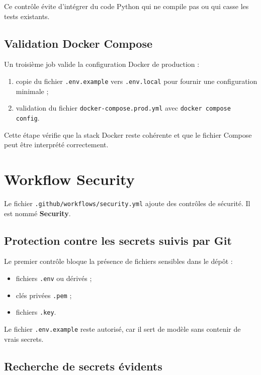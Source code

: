 \documentclass[11pt,a4paper]{article}
\begin{document}
Ce contrôle évite d'intégrer du code Python qui ne compile pas ou qui casse les
tests existants.

\subsection{Validation Docker Compose}

Un troisième job valide la configuration Docker de production :

\begin{enumerate}
  \item copie du fichier \texttt{.env.example} vers \texttt{.env.local} pour
        fournir une configuration minimale ;
  \item validation du fichier \texttt{docker-compose.prod.yml} avec
        \texttt{docker compose config}.
\end{enumerate}

Cette étape vérifie que la stack Docker reste cohérente et que le fichier Compose
peut être interprété correctement.

\section{Workflow Security}

Le fichier \texttt{.github/workflows/security.yml} ajoute des contrôles de
sécurité. Il est nommé \textbf{Security}.

\subsection{Protection contre les secrets suivis par Git}

Le premier contrôle bloque la présence de fichiers sensibles dans le dépôt :

\begin{itemize}
  \item fichiers \texttt{.env} ou dérivés ;
  \item clés privées \texttt{.pem} ;
  \item fichiers \texttt{.key}.
\end{itemize}

Le fichier \texttt{.env.example} reste autorisé, car il sert de modèle sans
contenir de vrais secrets.

\subsection{Recherche de secrets évidents}
\end{document}
